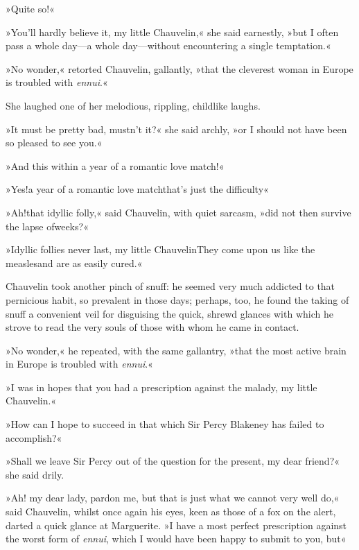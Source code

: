 »Quite so!«

»You'll hardly believe it, my little Chauvelin,« she said earnestly, »but I often pass a whole day—a whole day—without encountering a single temptation.«

»No wonder,« retorted Chauvelin, gallantly, »that the cleverest woman in Europe is troubled with \textit{ennui}.«

She laughed one of her melodious, rippling, childlike laughs.

»It must be pretty bad, mustn't it?« she said archly, »or I should not have been so pleased to see you.«

»And this within a year of a romantic love match!\textellipsis«

»Yes!\textellipsis \allowbreak  a year of a romantic love match\textellipsis \allowbreak  that's just the difficulty\textellipsis«

»Ah!\textellipsis \allowbreak  that idyllic folly,« said Chauvelin, with quiet sarcasm, »did not then survive the lapse of\textellipsis \allowbreak  weeks?«

»Idyllic follies never last, my little Chauvelin\textellipsis \allowbreak  They come upon us like the measles\textellipsis \allowbreak  and are as easily cured.«

Chauvelin took another pinch of snuff: he seemed very much addicted to that pernicious habit, so prevalent in those days; perhaps, too, he found the taking of snuff a convenient veil for disguising the quick, shrewd glances with which he strove to read the very souls of those with whom he came in contact.

»No wonder,« he repeated, with the same gallantry, »that the most active brain in Europe is troubled with \textit{ennui}.«

»I was in hopes that you had a prescription against the malady, my little Chauvelin.«

»How can I hope to succeed in that which Sir Percy Blakeney has failed to accomplish?«

»Shall we leave Sir Percy out of the question for the present, my dear friend?« she said drily.

»Ah! my dear lady, pardon me, but that is just what we cannot very well do,« said Chauvelin, whilst once again his eyes, keen as those of a fox on the alert, darted a quick glance at Marguerite. »I have a most perfect prescription against the worst form of \textit{ennui}, which I would have been happy to submit to you, but\longdash«


